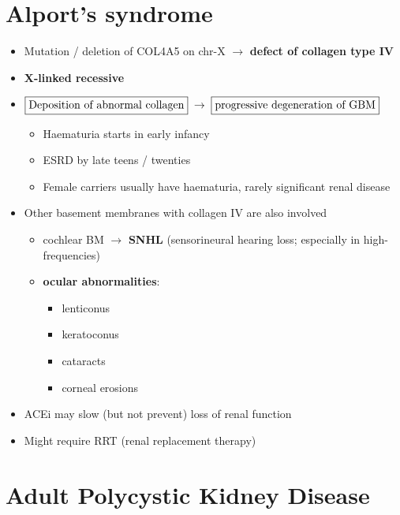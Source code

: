 \documentclass[
  12pt,
]{memoir}
\providecommand{\tightlist}{%
  \setlength{\itemsep}{0pt}\setlength{\parskip}{0pt}}
\begin{document}
\pagebreak

\hypertarget{alports-syndrome}{%
\section{Alport's syndrome}\label{alports-syndrome}}

\begin{itemize}
\tightlist
\item
  Mutation / deletion of COL4A5 on chr-X \(\rightarrow\) \textbf{defect
  of collagen type IV}
\item
  \textbf{X-linked recessive}
\item
  \(\fbox{Deposition of abnormal collagen}\;\rightarrow\;  \fbox{progressive degeneration of GBM}\)

  \begin{itemize}
  \tightlist
  \item
    Haematuria starts in early infancy
  \item
    ESRD by late teens / twenties
  \item
    Female carriers usually have haematuria, rarely significant renal
    disease
  \end{itemize}
\item
  Other basement membranes with collagen IV are also involved

  \begin{itemize}
  \tightlist
  \item
    cochlear BM \(\rightarrow\) \textbf{SNHL} (sensorineural hearing
    loss; especially in high-frequencies)
  \item
    \textbf{ocular abnormalities}:

    \begin{itemize}
    \tightlist
    \item
      lenticonus
    \item
      keratoconus
    \item
      cataracts
    \item
      corneal erosions
    \end{itemize}
  \end{itemize}
\item
  ACEi may slow (but not prevent) loss of renal function
\item
  Might require RRT (renal replacement therapy)
\end{itemize}

\hypertarget{adult-polycystic-kidney-disease}{%
\section{Adult Polycystic Kidney
Disease}\label{adult-polycystic-kidney-disease}}
\end{document}
